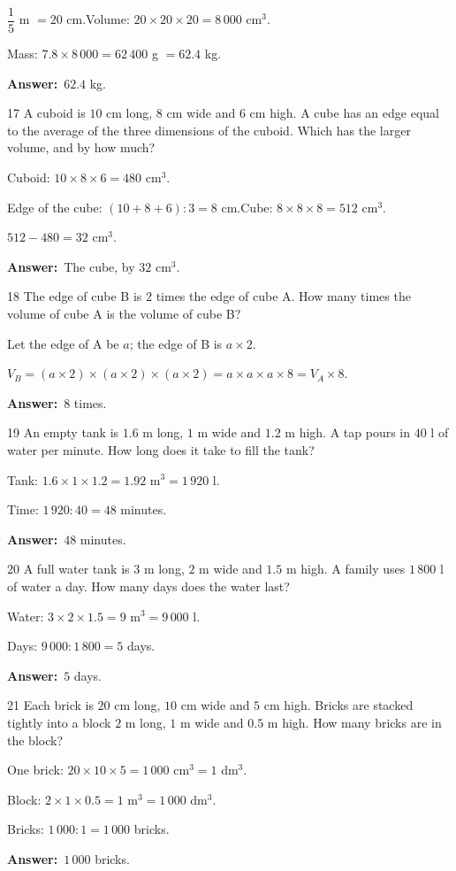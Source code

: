 \documentclass[11pt]{article}
\newif\ifsol \solfalse
\providecommand{\AnsWord}{Đáp số}
\newcommand{\dapso}[1]{\par\textbf{\AnsWord:}\ #1}
\newcommand{\probsol}[1]{%
  \begin{lrbox}{\solmeasure}\begin{minipage}{\dimexpr\linewidth-24pt\relax}#1\end{minipage}\end{lrbox}%
  \ifsol
    \begin{solbox}#1\end{solbox}%
  \else
    \setlength{\solht}{\dimexpr\ht\solmeasure+\dp\solmeasure+0.85cm\relax}%
    \ifdim\solht<1.35cm\setlength{\solht}{1.35cm}\fi
    \begin{tcolorbox}[colback=white,colframe=Line,boxrule=0.8pt,arc=5pt,
      left=8pt,right=8pt,top=4pt,bottom=4pt,height=\solht]{\footnotesize\color{Slate}\itshape\WorkWord}\end{tcolorbox}%
  \fi}
\newcommand{\gap}{\vspace{0.3cm}}
\def\WorkWord{Your work:}
\def\AnsWord{Answer}
\begin{document}
\probsol{
$\dfrac15$ m $=20$ cm.\quad Volume: $20\times20\times20=8\,000$ cm$^3$.\par
Mass: $7.8\times8\,000=62\,400$ g $=62.4$ kg.
\dapso{$62.4$ kg.}}
\gap
\begin{probbox}{17}{\relax}
A cuboid is $10$ cm long, $8$ cm wide and $6$ cm high. A cube has an edge equal to the average of the three dimensions of the cuboid. Which has the larger volume, and by how much?
\end{probbox}
\probsol{
Cuboid: $10\times8\times6=480$ cm$^3$.\par
Edge of the cube: $(10+8+6):3=8$ cm.\quad Cube: $8\times8\times8=512$ cm$^3$.\par
$512-480=32$ cm$^3$.
\dapso{The cube, by $32$ cm$^3$.}}
\gap
\begin{probbox}{18}{\relax}
The edge of cube B is $2$ times the edge of cube A. How many times the volume of cube A is the volume of cube B?
\end{probbox}
\probsol{
Let the edge of A be $a$; the edge of B is $a\times2$.\par
$V_B=(a\times2)\times(a\times2)\times(a\times2)=a\times a\times a\times8=V_A\times8$.
\dapso{$8$ times.}}
\gap
\begin{probbox}{19}{\relax}
An empty tank is $1.6$ m long, $1$ m wide and $1.2$ m high. A tap pours in $40$ l of water per minute. How long does it take to fill the tank?
\end{probbox}
\probsol{
Tank: $1.6\times1\times1.2=1.92$ m$^3=1\,920$ l.\par
Time: $1\,920:40=48$ minutes.
\dapso{$48$ minutes.}}
\gap
\begin{probbox}{20}{\relax}
A full water tank is $3$ m long, $2$ m wide and $1.5$ m high. A family uses $1\,800$ l of water a day. How many days does the water last?
\end{probbox}
\probsol{
Water: $3\times2\times1.5=9$ m$^3=9\,000$ l.\par
Days: $9\,000:1\,800=5$ days.
\dapso{$5$ days.}}
\gap
\begin{probbox}{21}{\relax}
Each brick is $20$ cm long, $10$ cm wide and $5$ cm high. Bricks are stacked tightly into a block $2$ m long, $1$ m wide and $0.5$ m high. How many bricks are in the block?
\end{probbox}
\probsol{
One brick: $20\times10\times5=1\,000$ cm$^3=1$ dm$^3$.\par
Block: $2\times1\times0.5=1$ m$^3=1\,000$ dm$^3$.\par
Bricks: $1\,000:1=1\,000$ bricks.
\dapso{$1\,000$ bricks.}}
\end{document}
